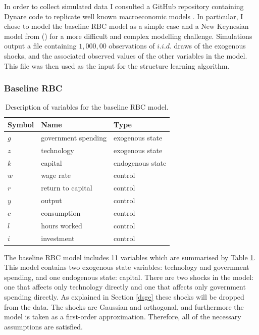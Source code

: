 \documentclass{article}
\begin{document}
In order to collect simulated data I consulted a GitHub repository containing Dynare code to replicate well known macroeconomic models \parencite{pfeifer2020}. In particular, I chose to model the baseline RBC model as a simple case and a New Keynesian model from \citeauthor{gali2015monetary} (\citeyear{gali2015monetary}) for a more difficult and complex modelling challenge. Simulations output a file containing $1,000,00$ observations of $i.i.d.$ draws of the exogenous shocks, and the associated observed values of the other variables in the model. This file was then used as the input for the structure learning algorithm.

\subsubsection{Baseline RBC}

\begin{table}
  \centering
  \begin{tabular}{|l|l|l|}
    \hline
    Symbol & Name & Type \\
    \hline
    $g$ & government spending & exogenous state \\
    $z$ & technology & exogenous state \\
    $k$ & capital & endogenous state \\
    $w$ & wage rate & control \\
    $r$ & return to capital & control \\
    $y$ & output & control \\
    $c$ & consumption & control \\
    $l$ & hours worked & control \\
    $i$ & investment & control \\ \cline{2-2}
    \hline
  \end{tabular}
  \caption{Description of variables for the baseline RBC model.}
  \label{rbc_data}
\end{table}

The baseline RBC model includes 11 variables which are summarised by Table \ref{rbc_data}. This model contains two exogenous state variables: technology and government spending, and one endogenous state: capital. There are two shocks in the model: one that affects only technology directly and one that affects only government spending directly. As explained in Section \ref{dsge} these shocks will be dropped from the data. The shocks are Gaussian and orthogonal, and furthermore the model is taken as a first-order approximation. Therefore, all of the necessary assumptions are satisfied.
\end{document}

